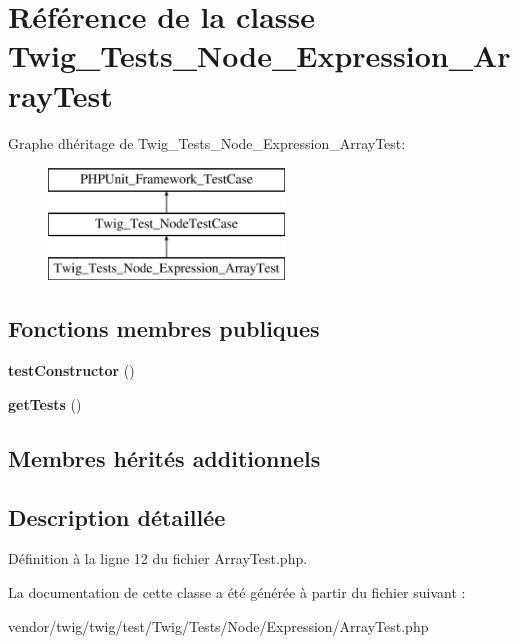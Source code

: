 \hypertarget{class_twig___tests___node___expression___array_test}{}\section{Référence de la classe Twig\+\_\+\+Tests\+\_\+\+Node\+\_\+\+Expression\+\_\+\+Array\+Test}
\label{class_twig___tests___node___expression___array_test}
Graphe d\textquotesingle{}héritage de Twig\+\_\+\+Tests\+\_\+\+Node\+\_\+\+Expression\+\_\+\+Array\+Test\+:\begin{figure}[H]
\begin{center}
\leavevmode
\includegraphics[height=3.000000cm]{class_twig___tests___node___expression___array_test}
\end{center}
\end{figure}
\subsection*{Fonctions membres publiques}
\begin{DoxyCompactItemize}
\item 
{\bfseries test\+Constructor} ()\hypertarget{class_twig___tests___node___expression___array_test_a47094dc941e72950570900d1418f89c6}{}\label{class_twig___tests___node___expression___array_test_a47094dc941e72950570900d1418f89c6}

\item 
{\bfseries get\+Tests} ()\hypertarget{class_twig___tests___node___expression___array_test_a7e247dd31cc8d37a6c97353a062a0080}{}\label{class_twig___tests___node___expression___array_test_a7e247dd31cc8d37a6c97353a062a0080}

\end{DoxyCompactItemize}
\subsection*{Membres hérités additionnels}


\subsection{Description détaillée}


Définition à la ligne 12 du fichier Array\+Test.\+php.



La documentation de cette classe a été générée à partir du fichier suivant \+:\begin{DoxyCompactItemize}
\item 
vendor/twig/twig/test/\+Twig/\+Tests/\+Node/\+Expression/Array\+Test.\+php\end{DoxyCompactItemize}

